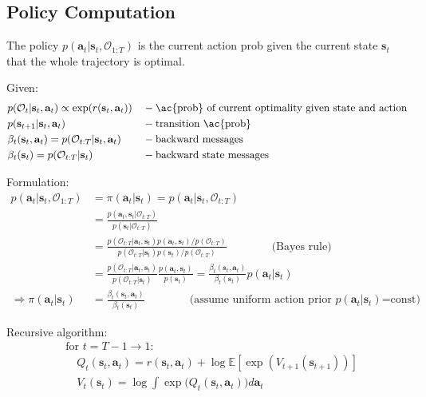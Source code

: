 \subsection{Policy Computation}
\label{subsec:policy-computation}
The policy $p(\textbf{a}_t | \textbf{s}_t, \mathcal{O}_{1:T})$ is the current action \ac{prob} given the current state $\textbf{s}_t$ that the whole trajectory is optimal.

Given:
\begin{align*}
	&p(\mathcal{O}_t| \textbf{s}_t, \textbf{a}_t) \propto \exp (r(\textbf{s}_t, \textbf{a}_t)) && -\text{\ac{prob} of current optimality given state and action}\\
	&p(\textbf{s}_{t+1} | \textbf{s}_t, \textbf{a}_t) && -\text{transition \ac{prob}}\\
	&\beta_t (\textbf{s}_t, \textbf{a}_t) = p(\mathcal{O}_{t:T}| \textbf{s}_t, \textbf{a}_t) && -\text{backward messages}\\
	&\beta_t (\textbf{s}_t) = p(\mathcal{O}_{t:T}| \textbf{s}_t) && -\text{backward state messages}
\end{align*}

Formulation:
\begin{align}
	p(\textbf{a}_t | \textbf{s}_t, \mathcal{O}_{1:T})
	&= \pi(\textbf{a}_t | \textbf{s}_t) = p(\textbf{a}_t | \textbf{s}_t, \mathcal{O}_{t:T})\\
	&= \frac{p(\textbf{a}_t, \textbf{s}_t | \mathcal{O}_{t:T})}{p(\textbf{s}_t | \mathcal{O}_{t:T})}\\
	&= \frac{p(\mathcal{O}_{t:T} | \textbf{a}_t, \textbf{s}_t) p(\textbf{a}_t, \textbf{s}_t) / p(\mathcal{O}_{t:T})}{p(\mathcal{O}_{t:T} | \textbf{s}_t) p(\textbf{s}_t) / p(\mathcal{O}_{t:T})} \qquad\qquad\text{(Bayes rule)}\\
	&= \frac{p(\mathcal{O}_{t:T} | \textbf{a}_t, \textbf{s}_t)}{p(\mathcal{O}_{t:T} | \textbf{s}_t)} \frac{p(\textbf{a}_t, \textbf{s}_t)}{p(\textbf{s}_t)} = \frac{\beta_t (\textbf{s}_t, \textbf{a}_t)}{\beta_t (\textbf{s}_t)} p(\textbf{a}_t | \textbf{s}_t)\\
	\Rightarrow \pi(\textbf{a}_t | \textbf{s}_t) &= \frac{\beta_t (\textbf{s}_t, \textbf{a}_t)}{\beta_t (\textbf{s}_t)} \qquad\qquad \text{(assume uniform action prior $p(\textbf{a}_t | \textbf{s}_t)$=const)}
\end{align}

Recursive algorithm:
\begin{align}
	&\text{for }t = T-1 \rightarrow 1:\\
	&\quad Q_t(\textbf{s}_t, \textbf{a}_t) = r(\textbf{s}_t, \textbf{a}_t) + \log \mathbb{E} \left[ \exp ( V_{t+1}(\textbf{s}_{t+1}) ) \right]\\
	&\quad V_t(\textbf{s}_t) = \log \int \exp \big(Q_t(\textbf{s}_t, \textbf{a}_t) \big) d\textbf{a}_t
\end{align}

